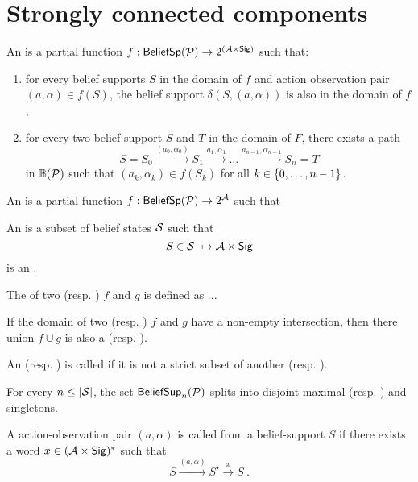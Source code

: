 %
\section{Strongly connected components}
%
\begin{definition}
%
An \emphdef{\aodscc} is a partial function $f : \bsp{\pdp} \to 2^{(\ac\times\sig)}$ such that:
\begin{enumerate}
    \item for every belief supports $S$ in the domain of $f$ and action observation pair $(a,\alpha) \in f(S)$,
    the belief support $\delta(S,(a,\alpha))$ is also in the domain of $f$,
    \item for every two belief support $S$ and $T$ in the domain of $F$, there exists a path
    \[
    S = S_0 \xrightarrow{(a_0,\alpha_0)}
    S_1 \xrightarrow{a_1,\alpha_1} 
    \dots
    \xrightarrow{a_{n-1},\alpha_{n-1}}
    S_n = T
    \]
    in $\baut{\pdp}$ such that $(a_k,\alpha_k)\in f(S_k)$ for all $k\in\set{0,\dots,n-1}$.
\end{enumerate}
\end{definition}
%
\begin{definition}
%
An \emphdef{\adscc} is a partial function $f : \bsp{\pdp} \to 2^{\ac}$ such that 
%
\end{definition}
%
\begin{definition}
An \emphdef{\scc{}} is a subset of belief states $\cS$ such that
\[
S\in\cS \ \mapsto \ac\times\sig
\]
is an \adscc{}. 
\end{definition}
%
\begin{definition}
The  of two \adscc{} (resp. \aodscc) $f$ and $g$ is defined as ...
\end{definition}
%
\begin{lemma}
If the domain of two \adscc{} (resp. \aodscc) $f$ and $g$ have a non-empty intersection,
then there union $f\cup g$ is also a \adscc{} (resp. \aodscc).
\end{lemma}
%
\begin{definition}
An \adscc{} (resp. \aodscc) is called  if it is not a strict subset of another \adscc{} (resp. \aodscc).
\end{definition}
%
\begin{corollary}
For every $n\leq |\st|$, the set $\bsup[n]{\pdp}$ splits into disjoint maximal \adscc{} (resp. \aodscc) and singletons.
\end{corollary}
%
\begin{definition}
A action-observation pair $(a,\alpha)$ is called  from a belief-support $S$ if there exists a word $x\in (\ac\times\sig)^*$ such that
\[
S \xrightarrow{(a,\alpha)} S' \xrightarrow{x} S \ .
\]
\end{definition}
